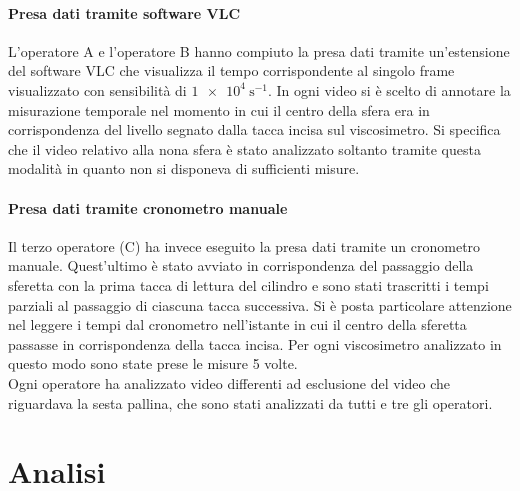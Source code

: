 \documentclass[a4paper,11pt,oneside]{article}
\begin{document}
\paragraph{Presa dati tramite software VLC}
L'operatore A e l'operatore B hanno compiuto la presa dati tramite un'estensione del software VLC che visualizza il tempo corrispondente al singolo frame visualizzato con sensibilità di $\SI{1e4}{\second^{-1}}$. In ogni video si è scelto di annotare la misurazione temporale nel momento in cui il centro della sfera era in corrispondenza del livello segnato dalla tacca incisa sul viscosimetro. Si specifica che il video relativo alla nona sfera è stato analizzato soltanto tramite questa modalità in quanto non si disponeva di sufficienti misure.

\paragraph{Presa dati tramite cronometro manuale}
Il terzo operatore (C) ha invece eseguito la presa dati tramite un cronometro manuale. Quest'ultimo è stato avviato in corrispondenza del passaggio della sferetta con la prima tacca di lettura del cilindro e sono stati trascritti i tempi parziali al passaggio di ciascuna tacca successiva. Si è posta particolare attenzione nel leggere i tempi dal cronometro nell'istante in cui il centro della sferetta passasse in corrispondenza della tacca incisa. Per ogni viscosimetro analizzato in questo modo sono state prese le misure 5 volte.\\ \newline
Ogni operatore ha analizzato video differenti ad esclusione del video che riguardava la sesta pallina, che sono stati analizzati da tutti e tre gli operatori. 

\section{Analisi}
\end{document}
